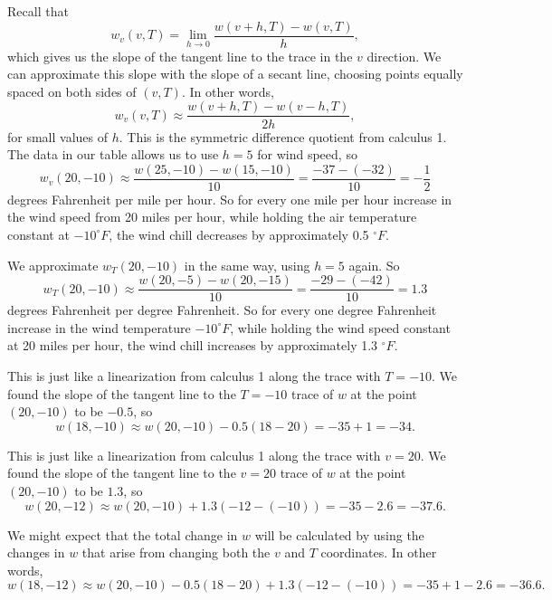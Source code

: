 \begin{activitySolution}
\ba
\item Recall that 
\[w_v(v,T) = \lim_{h \to 0} \frac{w(v+h,T) - w(v,T)}{h},\]
which gives us the slope of the tangent line to the trace in the $v$ direction. We can approximate this slope with the slope of a secant line, choosing points equally spaced on both sides of $(v,T)$. In other words,
\[w_v(v,T) \approx \frac{w(v+h,T) - w(v-h,T)}{2h},\]
for small values of $h$. This is the symmetric difference quotient from calculus 1. 
The data in our table allows us to use $h=5$ for wind speed, so 
\[w_v(20,-10) \approx \frac{w(25,-10)-w(15,-10)}{10} = \frac{-37-(-32)}{10} = -\frac{1}{2}\]
degrees Fahrenheit per mile per hour. So for every one mile per hour increase in the wind speed from 20 miles per hour, while holding the air temperature constant at $-10^{\circ}F$, the wind chill decreases by approximately 0.5 $^{\circ}F$. 
\item We approximate $w_T(20,-10)$ in the same way, using $h=5$ again. So 
\[w_T(20,-10) \approx \frac{w(20,-5)-w(20,-15)}{10} = \frac{-29-(-42)}{10} = 1.3\]
degrees Fahrenheit per degree Fahrenheit. So for every one degree Fahrenheit increase in the wind temperature $-10^{\circ}F$, while holding the wind speed constant at 20 miles per hour, the wind chill increases by approximately 1.3 $^{\circ}F$.  
\item This is just like a linearization from calculus 1 along the trace with $T=-10$. We found the slope of the tangent line to the $T=-10$ trace of $w$ at the point $(20,-10)$ to be $-0.5$, so  
\[w(18,-10) \approx  w(20,-10) - 0.5(18-20) = -35 + 1 = -34.\]
\item This is just like a linearization from calculus 1 along the trace with $v=20$. We found the slope of the tangent line to the $v=20$ trace of $w$ at the point $(20,-10)$ to be $1.3$, so  
\[w(20,-12) \approx  w(20,-10) + 1.3(-12-(-10)) = -35 - 2.6 = -37.6.\]
\item We might expect that the total change in $w$ will be calculated by using the changes in $w$ that arise from changing both the $v$ and $T$ coordinates. In other words,
\[w(18,-12) \approx w(20,-10) - 0.5(18-20) + 1.3(-12-(-10)) = -35 + 1 - 2.6 = -36.6.\]
\ea
\end{activitySolution}

\aftera

